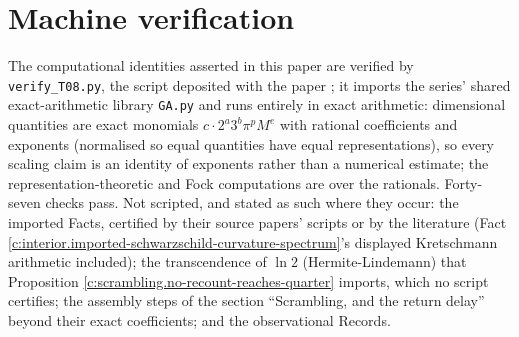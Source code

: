 \documentclass[11pt]{article}
\theoremstyle{definition}
\theoremstyle{plain}
\begin{document}
\section{Machine verification}

\label{c:note.scrambling.setting-machine-verification}
The computational identities asserted in this paper are verified by \texttt{verify\_T08.py}, the script deposited with the paper \cite{ButlerVerifyT8}; it imports the series' shared exact-arithmetic library \texttt{GA.py} and runs entirely in exact arithmetic: dimensional quantities are exact monomials $c\cdot 2^a 3^b \pi^p M^e$ with rational coefficients and exponents (normalised so equal quantities have equal representations), so every scaling claim is an identity of exponents rather than a numerical estimate; the representation-theoretic and Fock computations are over the rationals. Forty-seven checks pass. Not scripted, and stated as such where they occur: the imported Facts, certified by their source papers' scripts or by the literature (Fact \ref{c:interior.imported-schwarzschild-curvature-spectrum}'s displayed Kretschmann arithmetic included); the transcendence of $\ln 2$ (Hermite-Lindemann) that Proposition \ref{c:scrambling.no-recount-reaches-quarter} imports, which no script certifies; the assembly steps of the section ``Scrambling, and the return delay'' beyond their exact coefficients; and the observational Records.
\end{document}

